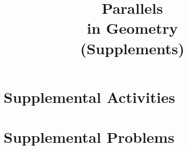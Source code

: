\documentclass[justified,openany,nofonts]{tufte-book}
\title{Parallels \\ in Geometry \\ (Supplements)}
\author{\teachingnotes}
\renewcommand{\theenumi}{$(\mathrm{\arabic{enumi}})$}
\renewcommand{\labelenumi}{\theenumi}
\begin{document}
\def\document#1{} %
\maketitle

\setcounter{tocdepth}{1}
\tableofcontents

\setcounter{secnumdepth}{2} %





%

\appendix

\renewcommand{\theenumi}{$(\mathrm{\alph{enumi}})$}
\renewcommand{\labelenumi}{\theenumi}
\chapter{Supplemental Activities}




% 



%





\chapter{Supplemental Problems}




\end{document}

